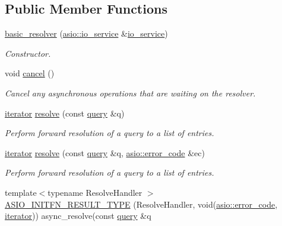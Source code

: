 \subsection*{Public Member Functions}
\begin{DoxyCompactItemize}
\item 
\hyperlink{classasio_1_1ip_1_1basic__resolver_a6b8ece8d6af3c0d8f649704c617951dd}{basic\+\_\+resolver} (\hyperlink{classasio_1_1io__service}{asio\+::io\+\_\+service} \&\hyperlink{classasio_1_1io__service}{io\+\_\+service})
\begin{DoxyCompactList}\small\item\em Constructor. \end{DoxyCompactList}\item 
void \hyperlink{classasio_1_1ip_1_1basic__resolver_a5e73618c5580c88533ff9f052e4c85c2}{cancel} ()
\begin{DoxyCompactList}\small\item\em Cancel any asynchronous operations that are waiting on the resolver. \end{DoxyCompactList}\item 
\hyperlink{classasio_1_1ip_1_1basic__resolver_ad1cc50a31ba4971329a34eb01ef5a21c}{iterator} \hyperlink{classasio_1_1ip_1_1basic__resolver_af2f65826f8d0d8bcf94a7974b0fe8a15}{resolve} (const \hyperlink{classasio_1_1ip_1_1basic__resolver_ac842e1f99be7849517bcd365fecb423c}{query} \&q)
\begin{DoxyCompactList}\small\item\em Perform forward resolution of a query to a list of entries. \end{DoxyCompactList}\item 
\hyperlink{classasio_1_1ip_1_1basic__resolver_ad1cc50a31ba4971329a34eb01ef5a21c}{iterator} \hyperlink{classasio_1_1ip_1_1basic__resolver_ab6e1554e4f3b468227bad700a63a9a68}{resolve} (const \hyperlink{classasio_1_1ip_1_1basic__resolver_ac842e1f99be7849517bcd365fecb423c}{query} \&q, \hyperlink{classasio_1_1error__code}{asio\+::error\+\_\+code} \&ec)
\begin{DoxyCompactList}\small\item\em Perform forward resolution of a query to a list of entries. \end{DoxyCompactList}\item 
{\footnotesize template$<$typename Resolve\+Handler $>$ }\\\hyperlink{classasio_1_1ip_1_1basic__resolver_ae5051d46042a4f001b5a6bc7f8931f6f}{A\+S\+I\+O\+\_\+\+I\+N\+I\+T\+F\+N\+\_\+\+R\+E\+S\+U\+L\+T\+\_\+\+T\+Y\+P\+E} (Resolve\+Handler, void(\hyperlink{classasio_1_1error__code}{asio\+::error\+\_\+code}, \hyperlink{classasio_1_1ip_1_1basic__resolver_ad1cc50a31ba4971329a34eb01ef5a21c}{iterator})) async\+\_\+resolve(const \hyperlink{classasio_1_1ip_1_1basic__resolver_ac842e1f99be7849517bcd365fecb423c}{query} \&q

\end{DoxyCompactItemize}
